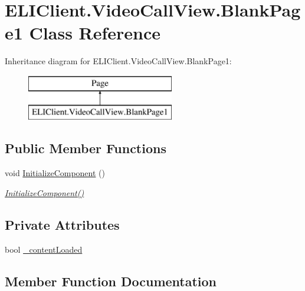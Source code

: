 \hypertarget{class_e_l_i_client_1_1_video_call_view_1_1_blank_page1}{}\section{E\+L\+I\+Client.\+Video\+Call\+View.\+Blank\+Page1 Class Reference}
\label{class_e_l_i_client_1_1_video_call_view_1_1_blank_page1}
Inheritance diagram for E\+L\+I\+Client.\+Video\+Call\+View.\+Blank\+Page1\+:\begin{figure}[H]
\begin{center}
\leavevmode
\includegraphics[height=2.000000cm]{d5/d30/class_e_l_i_client_1_1_video_call_view_1_1_blank_page1}
\end{center}
\end{figure}
\subsection*{Public Member Functions}
\begin{DoxyCompactItemize}
\item 
void \hyperlink{class_e_l_i_client_1_1_video_call_view_1_1_blank_page1_acf68a80b35fbd1ff82e0e825ae9c1941}{Initialize\+Component} ()
\begin{DoxyCompactList}\small\item\em \hyperlink{class_e_l_i_client_1_1_video_call_view_1_1_blank_page1_acf68a80b35fbd1ff82e0e825ae9c1941}{Initialize\+Component()} \end{DoxyCompactList}\end{DoxyCompactItemize}
\subsection*{Private Attributes}
\begin{DoxyCompactItemize}
\item 
bool \hyperlink{class_e_l_i_client_1_1_video_call_view_1_1_blank_page1_a24183bacd9fc76491bebcbe754dc5d3e}{\+\_\+content\+Loaded}
\end{DoxyCompactItemize}


\subsection{Member Function Documentation}
\mbox{\label{class_e_l_i_client_1_1_video_call_view_1_1_blank_page1_acf68a80b35fbd1ff82e0e825ae9c1941}} 
